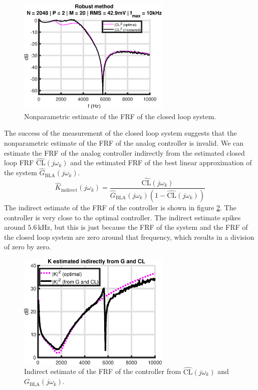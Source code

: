 \begin{figure}[H]
\centering
\includegraphics[width = 0.65\textwidth]{figures/robust_method_CL.eps}
\caption{Nonparametric estimate of the FRF of the closed loop system.}
\label{fig:CL_measure}
\end{figure}

\newpage
The success of the measurement of the closed loop system suggests that the nonparametric estimate of the FRF of the analog controller is invalid. We can estimate the FRF of the analog controller indirectly from the estimated closed loop FRF $\hat{\textrm{CL}}(j\omega_k)$ and the estimated FRF of the best linear approximation of the system $\hat G_{\mathrm{BLA}}(j\omega_k)$.
\begin{equation*}
	\hat{K}_{\mathrm{indirect}}(j\omega_k) =  \frac{\hat{\textrm{CL}}(j\omega_k)}{\hat G_{\mathrm{BLA}}(j\omega_k)(1-\hat{\textrm{CL}}(j\omega_k))}
\end{equation*}
The indirect estimate of the FRF of the controller is shown in figure \ref{fig:K_from_G_CL}. The controller is very close to the optimal controller. The indirect estimate spikes around $5.6 \, \mathrm{kHz}$, but this is just because the FRF of the system and the FRF of the closed loop system are zero around that frequency, which results in a division of zero by zero.

\begin{figure}[H]
\centering
\includegraphics[width = 0.65\textwidth]{figures/K_from_G_CL.eps}
\caption{Indirect estimate of the FRF of the controller from $\hat{\textrm{CL}}(j\omega_k)$ and $G_{\mathrm{BLA}}(j\omega_k)$.}
\label{fig:K_from_G_CL}
\end{figure}

